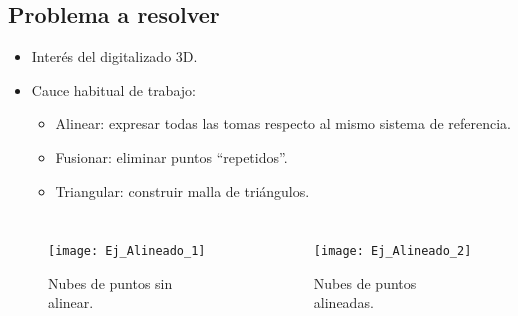 \documentclass[9pt]{beamer}
\begin{document}
	\subsection{Problema a resolver}
	\begin{frame}
		\begin{itemize}
			\item Interés del digitalizado 3D.
			\item Cauce habitual de trabajo:
			\begin{itemize}
				\item Alinear: expresar todas las tomas respecto al mismo sistema de referencia.
				\item Fusionar: eliminar puntos ``repetidos''.
				\item Triangular: construir malla de triángulos.
			\end{itemize}
		\end{itemize}
	\begin{columns}
		\begin{figure}[h!]
			\texttt{[image: Ej\_Alineado\_1]}
			\caption{Nubes de puntos sin alinear.}
		\end{figure}
		\begin{figure}[h!]
			\texttt{[image: Ej\_Alineado\_2]}
			\caption{Nubes de puntos alineadas.}
		\end{figure} 
	\end{columns}

	\end{frame}
\end{document}
